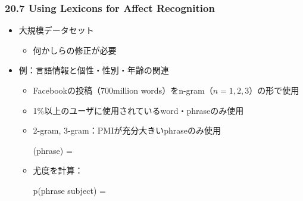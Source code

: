 
\begin{frame}
    \frametitle{20.7 Using Lexicons for Affect Recognition}
    \begin{itemize}
        \item 大規模データセット
        \begin{itemize}
            \item 何かしらの修正が必要
        \end{itemize}
    \end{itemize}
    \begin{itemize}
        \item 例：言語情報と個性・性別・年齢の関連 
        \begin{itemize}
            \item Facebookの投稿{\footnotesize（700million words）}をn-gram（$n=1,2,3$）の形で使用
            \item 1\%以上のユーザに使用されているword・phraseのみ使用
            \item 2-gram, 3-gram：PMIが充分大きいphraseのみ使用
                \begin{yalign*}
                    (phrase) = \log {}
                \end{yalign*}
            \item 尤度を計算：
                \begin{yalign*}
                    p(phrase \mid subject) = 
                \end{yalign*}
        \end{itemize}
    \end{itemize}
\end{frame}



